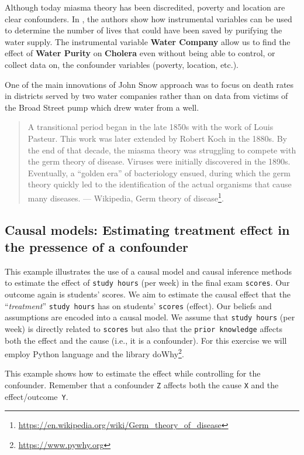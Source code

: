 \documentclass[
  12pt,
]{book}
\DeclareRobustCommand{\href}[2]{#2\footnote{\url{#1}}}
\begin{document}
Although today miasma theory has been discredited, poverty and location are clear confounders. In \citep{book-of-why}, the authors show how instrumental variables can be used to determine the number of lives that could have been saved by purifying the water supply. The instrumental variable \textbf{Water Company} allow us to find the effect of \textbf{Water Purity} on \textbf{Cholera} even without being able to control, or collect data on, the confounder variables (poverty, location, etc.).

One of the main innovations of John Snow approach was to focus on death rates in districts served by two water companies rather than on data from victims of the Broad Street pump which drew water from a well.

\begin{quote}
A transitional period began in the late 1850s with the work of Louis Pasteur. This work was later extended by Robert Koch in the 1880s. By the end of that decade, the miasma theory was struggling to compete with the germ theory of disease. Viruses were initially discovered in the 1890s. Eventually, a ``golden era'' of bacteriology ensued, during which the germ theory quickly led to the identification of the actual organisms that cause many diseases. --- Wikipedia, \href{https://en.wikipedia.org/wiki/Germ_theory_of_disease}{Germ theory of disease}.
\end{quote}

\subsection{Causal models: Estimating treatment effect in the pressence of a confounder}\label{causal-models}

This example illustrates the use of a causal model and causal inference methods to estimate the effect of \texttt{study\ hours} (per week) in the final exam \texttt{scores}. Our outcome again is students' scores. We aim to estimate the causal effect that the ``\emph{treatment}'' \texttt{study\ hours} has on students' \texttt{scores} (effect). Our beliefs and assumptions are encoded into a causal model. We assume that \texttt{study\ hours} (per week) is directly related to \texttt{scores} but also that the \texttt{prior\ knowledge} affects both the effect and the cause (i.e., it is a confounder). For this exercise we will employ Python language and the library \href{https://www.pywhy.org}{doWhy}.

This example shows how to estimate the effect while controlling for the confounder. Remember that a confounder \texttt{Z} affects both the cause \texttt{X} and the effect/outcome~\texttt{Y}.
\end{document}
